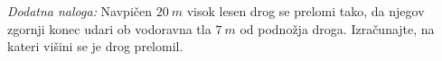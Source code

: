 \documentclass[addpoints]{exam}
\begin{document}
\begin{questions}
\begin{parts}
        \begin{solution}[3cm]
            
        \end{solution}

    \end{parts}




    \bonusquestion[3]
    \textit{Dodatna naloga:} Navpičen $20~m$ visok lesen drog se prelomi tako, 
    da njegov zgornji konec udari ob vodoravna tla $7~m$ od podnožja droga.
    Izračunajte, na kateri višini se je drog prelomil.




\end{questions}
\end{document}
